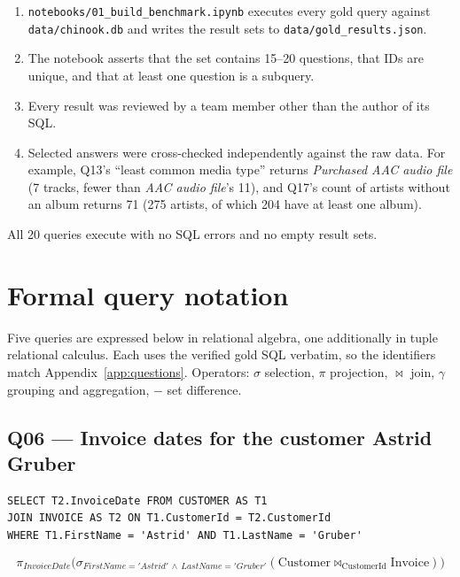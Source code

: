 \documentclass[11pt]{article}
\newcommand{\proj}[1]{\pi_{#1}}
\newcommand{\sel}[1]{\sigma_{#1}}
\newcommand{\jn}{\bowtie}
\begin{document}
\begin{enumerate}[leftmargin=*,topsep=2pt,itemsep=2pt]
  \item \texttt{notebooks/01\_build\_benchmark.ipynb} executes every gold query against
        \texttt{data/chinook.db} and writes the result sets to \texttt{data/gold\_results.json}.
  \item The notebook asserts that the set contains 15--20 questions, that IDs are unique, and
        that at least one question is a subquery.
  \item Every result was reviewed by a team member other than the author of its SQL.
  \item Selected answers were cross-checked independently against the raw data. For example,
        Q13's ``least common media type'' returns \emph{Purchased AAC audio file} (7 tracks,
        fewer than \emph{AAC audio file}'s 11), and Q17's count of artists without an album
        returns 71 (275 artists, of which 204 have at least one album).
\end{enumerate}

\noindent
All 20 queries execute with no SQL errors and no empty result sets.

\section{Formal query notation}\label{sec:algebra}

Five queries are expressed below in relational algebra, one additionally in tuple relational
calculus. Each uses the verified gold SQL verbatim, so the identifiers match
Appendix~\ref{app:questions}. Operators: $\sigma$ selection, $\pi$ projection, $\jn$ join,
$\gamma$ grouping and aggregation, $-$ set difference.

\subsection*{Q06 --- Invoice dates for the customer Astrid Gruber}

\begin{lstlisting}
SELECT T2.InvoiceDate FROM CUSTOMER AS T1
JOIN INVOICE AS T2 ON T1.CustomerId = T2.CustomerId
WHERE T1.FirstName = 'Astrid' AND T1.LastName = 'Gruber'
\end{lstlisting}

\[
\proj{InvoiceDate}\bigl(\sel{FirstName='Astrid'\,\wedge\,LastName='Gruber'}(
  \text{Customer} \jn_{\text{CustomerId}} \text{Invoice})\bigr)
\]
\end{document}
